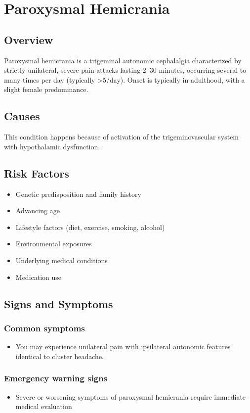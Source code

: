 \chapter{Paroxysmal Hemicrania}
\label{sec:Paroxysmal Hemicrania}

\section{Overview}
Paroxysmal hemicrania is a trigeminal autonomic cephalalgia characterized by strictly unilateral, severe pain attacks lasting 2--30 minutes, occurring several to many times per day (typically >5/day). Onset is typically in adulthood, with a slight female predominance.
\section{Causes}
This condition happens because of activation of the trigeminovascular system with hypothalamic dysfunction.     
\section{Risk Factors}

\begin{itemize}[noitemsep]
  \item Genetic predisposition and family history
  \item Advancing age
  \item Lifestyle factors (diet, exercise, smoking, alcohol)
  \item Environmental exposures
  \item Underlying medical conditions
  \item Medication use
\end{itemize}
\section{Signs and Symptoms}

\subsection{Common symptoms}
\begin{itemize}[noitemsep]
  \item You may experience unilateral pain with ipsilateral autonomic features identical to cluster headache. 
  \end{itemize}

\subsection{Emergency warning signs}
\begin{itemize}[noitemsep]
  \item Severe or worsening symptoms of paroxysmal hemicrania require immediate medical evaluation
\end{itemize}
